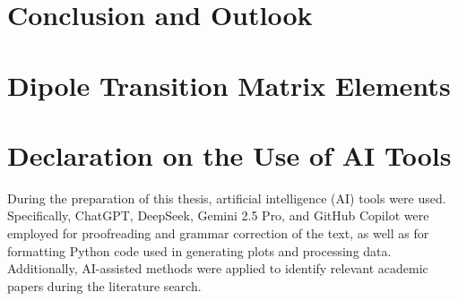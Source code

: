 \documentclass[12pt, twoside]{report}
\begin{document}
\chapter{Conclusion and Outlook}

\cleardoublepage


\appendix
% 


\chapter{Dipole Transition Matrix Elements}

\cleardoublepage


% 


% 


% 



\cleardoublepage

\chapter*{Declaration on the Use of AI Tools}

During the preparation of this thesis, artificial intelligence (AI) tools were used.
Specifically, ChatGPT, DeepSeek, Gemini 2.5 Pro, and GitHub Copilot were employed for proofreading and grammar correction of the text, as well as for formatting Python code used in generating plots and processing data.
Additionally, AI-assisted methods were applied to identify relevant academic papers during the literature search.

\clearpage
\thispagestyle{empty}
\null
\clearpage
\end{document}
